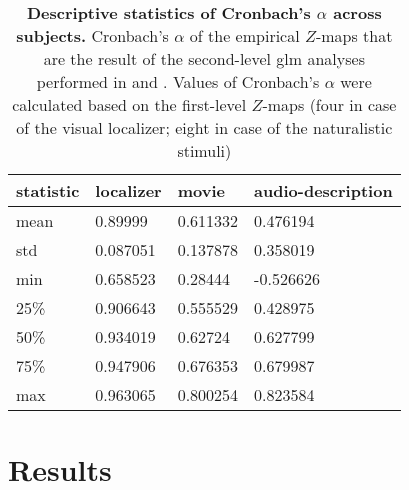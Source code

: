\begin{table*}[btp]
\centering
    \caption{
    \textbf{Descriptive statistics of Cronbach's $\alpha$ across subjects.}
    Cronbach's $\alpha$ of the empirical $Z$-maps that are the result of the
    second-level \ac{glm} analyses performed in
    \citet{sengupta2016extension} and \citet{haeusler2022processing}. Values of
    Cronbach's $\alpha$ were calculated based on the first-level $Z$-maps (four
    in case of the visual localizer; eight in case of the naturalistic stimuli)}
\label{tab:cronbachs}
\begin{tabular}{llll}
    \toprule
    \textbf{statistic} & \textbf{localizer} & \textbf{movie} & \textbf{audio-description} \\
    \midrule
    mean & 0.89999 & 0.611332 & 0.476194 \tabularnewline
    std & 0.087051 & 0.137878 & 0.358019 \tabularnewline
    min & 0.658523 & 0.28444 & -0.526626 \tabularnewline
    25\% & 0.906643 & 0.555529 & 0.428975 \tabularnewline
    50\% & 0.934019 & 0.62724 & 0.627799 \tabularnewline
    75\% & 0.947906 & 0.676353 & 0.679987 \tabularnewline
    max & 0.963065 & 0.800254 & 0.823584 \tabularnewline
    \bottomrule
\end{tabular}
\end{table*}



\section{Results}


\begin{comment}

``Because the localizer task comprises several scanning runs, we calculated the
reliability of the localizer across runs with Cronbach's $\alpha$ to provide an
estimate of the noise ceiling for these correlations'' \citep{jiahui2022cross}.

\end{comment}



